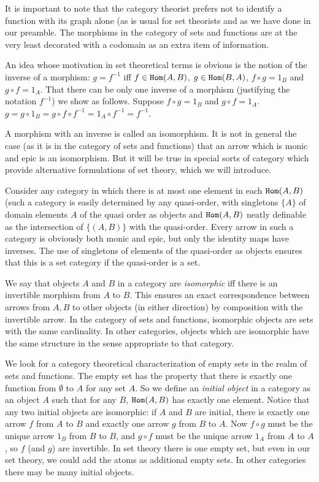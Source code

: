 \documentclass[12pt]{article}
\begin{document}
It is important to note that the category theorist prefers not to identify a function with its graph alone (as is usual for set theorists and as we have done in our preamble.  The morphisms in the category of sets and functions are at the very least decorated with a codomain as an extra item of information.

An idea whose motivation in set theoretical terms is obvious is the notion of the inverse of a morphism:  $g=f^{-1}$ iff $f \in {\tt Hom}(A,B)$, $g \in {\tt Hom}(B,A)$, $f \circ g = 1_B$ and $g \circ f = 1_A$.   That there can be only one inverse of a morphism (justifying the notation $f^{-1}$) we show as follows.  Suppose $f \circ g = 1_B$ and $g \circ f = 1_A$.
$g = g \circ 1_B = g \circ f \circ f^{-1} = 1_A \circ f^{-1} = f^{-1}$.

A morphism with an inverse is called an isomorphism.  It is not in general the case (as it is in the category of sets and functions) that an arrow which is monic and epic is an isomorphism.  But it will be true in special sorts of category which provide alternative formulations of set theory, which we will introduce.

Consider any category in which there is at most one element in each ${\tt Hom}(A,B)$ (such a category is easily determined by any quasi-order, with singletons $\{A\}$ of domain elements $A$ of the quasi order as objects and ${\tt Hom}(A,B)$ neatly definable as the intersection of $\{(A,B)\}$ with the quasi-order.   Every arrow in such a category is obviously both monic and epic, but only the identity maps have inverses.  The use of singletons of elements of the quasi-order as objects ensures that this is a set category if the quasi-order is a set.

We say that objects $A$ and $B$ in a category are {\em isomorphic\/} iff there is an invertible morphism from $A$ to $B$.  This ensures an exact correspondence between arrows from $A, B$ to other objects (in either direction) by composition with the invertible arrow.  In the category of sets and functions, isomorphic objects are sets with the same cardinality.  In other categories, objects which are isomorphic have the same structure in the sense appropriate to that category.

We look for a category theoretical characterization of empty sets in the realm of sets and functions.  The empty set has the property that there is exactly one function from $\emptyset$ to $A$ for any set $A$.   So we define an {\em initial object\/} in a category as an object $A$ such that for any
$B$, ${\tt Hom}(A,B)$ has exactly one element.  Notice that any two initial objects are isomorphic:  if $A$ and $B$ are initial, there is exactly one arrow $f$ from $A$ to $B$ and exactly one arrow $g$ from $B$ to $A$.  Now $f \circ g$ must be the unique arrow $1_B$ from $B$ to $B$,
and $g \circ f$ must be the unique arrow $1_A$ from $A$ to $A$, so $f$ (and $g$) are invertible.  In set theory there is one empty set, but even in our set theory, we could add the atoms as additional empty sets.  In other categories there may be many initial objects.
\end{document}
